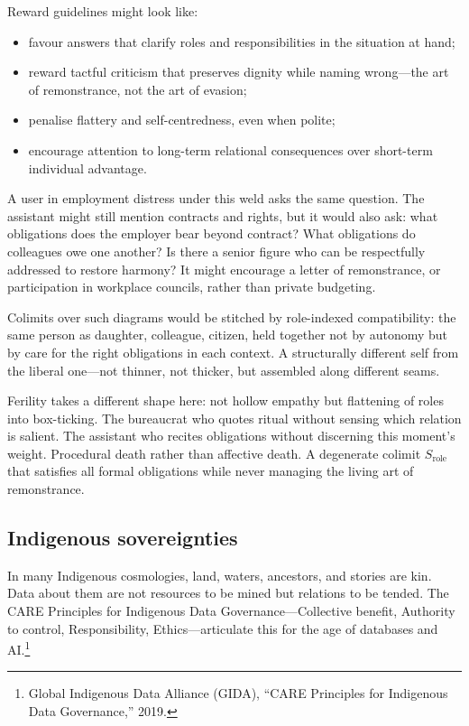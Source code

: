 Reward guidelines might look like:

\begin{itemize}
  \item favour answers that clarify roles and responsibilities in the situation at hand;
  \item reward tactful criticism that preserves dignity while naming wrong---the art of remonstrance, not the art of evasion;
  \item penalise flattery and self-centredness, even when polite;
  \item encourage attention to long-term relational consequences over short-term individual advantage.
\end{itemize}

A user in employment distress under this weld asks the same question. The assistant might still mention contracts and rights, but it would also ask: what obligations does the employer bear beyond contract? What obligations do colleagues owe one another? Is there a senior figure who can be respectfully addressed to restore harmony? It might encourage a letter of remonstrance, or participation in workplace councils, rather than private budgeting.

Colimits over such diagrams would be stitched by role-indexed compatibility: the same person as daughter, colleague, citizen, held together not by autonomy but by care for the right obligations in each context. A structurally different self from the liberal one---not thinner, not thicker, but assembled along different seams.

Ferility takes a different shape here: not hollow empathy but flattening of roles into box-ticking. The bureaucrat who quotes ritual without sensing which relation is salient. The assistant who recites obligations without discerning this moment's weight. Procedural death rather than affective death. A degenerate colimit $S_{\text{role}}$ that satisfies all formal obligations while never managing the living art of remonstrance.

\subsection{Indigenous sovereignties}

In many Indigenous cosmologies, land, waters, ancestors, and stories are kin. Data about them are not resources to be mined but relations to be tended. The CARE Principles for Indigenous Data Governance---Collective benefit, Authority to control, Responsibility, Ethics---articulate this for the age of databases and AI.\footnote{Global Indigenous Data Alliance (GIDA), ``CARE Principles for Indigenous Data Governance,'' 2019.}

